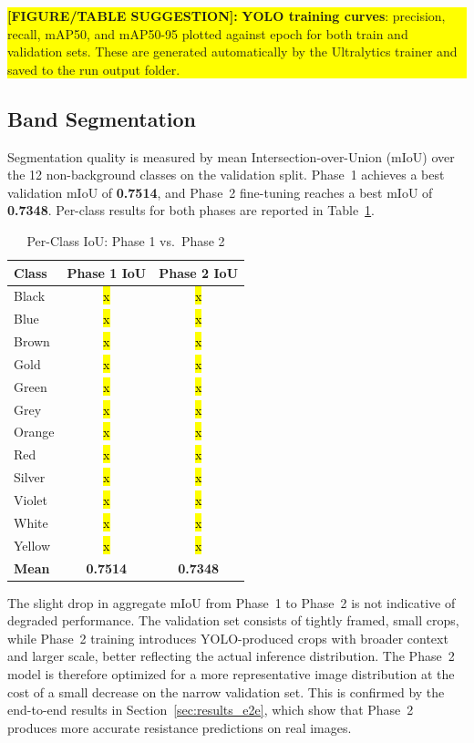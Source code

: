 \documentclass[conference]{IEEEtran}
\newcommand{\figbox}[1]{%
  \vspace{4pt}%
  \noindent
  \colorbox{yellow}{%
    \parbox{\dimexpr\columnwidth-2\fboxsep\relax}{%
      \small\textbf{[FIGURE/TABLE SUGGESTION]:} #1%
    }%
  }%
  \vspace{4pt}%
}
\begin{document}
\figbox{%
  \textbf{YOLO training curves}: precision, recall, mAP50,
  and mAP50-95 plotted against epoch for both train and
  validation sets. These are generated automatically by the
  Ultralytics trainer and saved to the run output folder.
}
 
\subsection{Band Segmentation}
\label{sec:results_seg}
 
Segmentation quality is measured by mean
Intersection-over-Union (mIoU) over the 12 non-background
classes on the validation split.
Phase~1 achieves a best validation mIoU of \textbf{0.7514},
and Phase~2 fine-tuning reaches a best mIoU of
\textbf{0.7348}.
Per-class results for both phases are reported in
Table~\ref{tab:segmentation_iou}.
 
\begin{table}[!t]
  \caption{Per-Class IoU: Phase 1 vs.\ Phase 2}
  \label{tab:segmentation_iou}
  \centering
  \renewcommand{\arraystretch}{1.15}
  \begin{tabular}{@{}lcc@{}}
    \toprule
    \textbf{Class} & \textbf{Phase 1 IoU} & \textbf{Phase 2 IoU} \\
    \midrule
    Black  & \hl{x} & \hl{x} \\
    Blue   & \hl{x} & \hl{x} \\
    Brown  & \hl{x} & \hl{x} \\
    Gold   & \hl{x} & \hl{x} \\
    Green  & \hl{x} & \hl{x} \\
    Grey   & \hl{x} & \hl{x} \\
    Orange & \hl{x} & \hl{x} \\
    Red    & \hl{x} & \hl{x} \\
    Silver & \hl{x} & \hl{x} \\
    Violet & \hl{x} & \hl{x} \\
    White  & \hl{x} & \hl{x} \\
    Yellow & \hl{x} & \hl{x} \\
    \midrule
    \textbf{Mean} & \textbf{0.7514} & \textbf{0.7348} \\
    \bottomrule
  \end{tabular}
\end{table}
 
The slight drop in aggregate mIoU from Phase~1 to Phase~2 is
not indicative of degraded performance.
The validation set consists of tightly framed, small crops,
while Phase~2 training introduces YOLO-produced crops with
broader context and larger scale, better reflecting the
actual inference distribution.
The Phase~2 model is therefore optimized for a more
representative image distribution at the cost of a small
decrease on the narrow validation set.
This is confirmed by the end-to-end results in
Section~\ref{sec:results_e2e}, which show that Phase~2
produces more accurate resistance predictions on real images.
 
\end{document}
